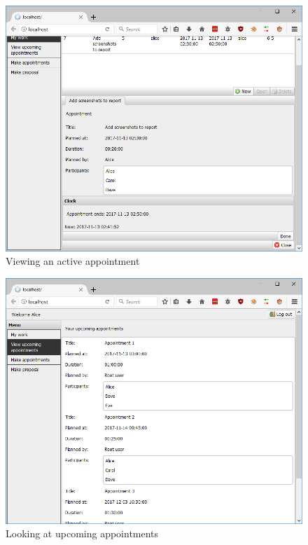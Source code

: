 \documentclass{article}
\begin{document}
	\begin{figure}[h!]
		\includegraphics[width=\textwidth]{09_view_appointment}
		\caption{Viewing an active appointment}
	\end{figure}
	
	\begin{figure}[h!]
		\includegraphics[width=\textwidth]{10_upcoming_appointments}
		\caption{Looking at upcoming appointments}
	\end{figure}
	
\end{document}
